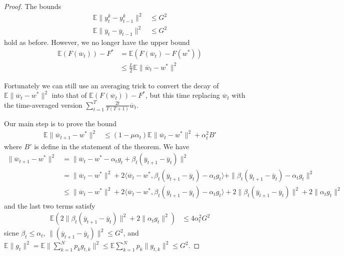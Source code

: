 \begin{proof}
	The bounds 
	\begin{align*}
	\mathbb{E}\|y_{t}^{k}-y_{t-1}^{k}\|^{2} & \leq G^{2}\\
	\mathbb{E}\|\overline{y}_{t}-\overline{y}_{t-1}\|^{2} & \leq G^{2}
	\end{align*}
	hold as before. However, we no longer have the upper bound
	\begin{align*}
	\mathbb{E}(F(\overline{w}_{t}))-F^{\ast} & =\mathbb{E}(F(\overline{w}_{t})-F(w^{\ast}))\\
	& \leq\frac{L}{2}\mathbb{E}\|\overline{w}_{t}-w^{\ast}\|^{2}
	\end{align*}
	
	Fortunately we can still use an averaging trick to convert the decay
	of $\mathbb{E}\|\overline{w}_{t}-w^{\ast}\|^{2}$ into that of $\mathbb{E}(F(\overline{w}_{t}))-F^{\ast}$,
	but this time replacing $\overline{w}_{t}$ with the time-averaged
	version $\sum_{t=1}^{T}\frac{2t}{T(T+1)}\overline{w}_{t}$.
	
	Our main step is to prove the bound 
	\begin{align*}
	\mathbb{E}\|\overline{w}_{t+1}-w^{\ast}\|^{2} & \leq(1-\mu\alpha_{t})\mathbb{E}\|\overline{w}_{t}-w^{\ast}\|^{2}+\alpha_{t}^{2}B'
	\end{align*}
	where $B'$ is define in the statement of the theorem. We have 
	\begin{align*}
	\|\overline{w}_{t+1}-w^{\ast}\|^{2} & =\|\overline{w}_{t}-w^{\ast}-\alpha_{t}g_{t}+\beta_{t}(\overline{y}_{t+1}-\overline{y}_{t})\|^{2}\\
	& =\|\overline{w}_{t}-w^{\ast}\|^{2}+2\langle\overline{w}_{t}-w^{\ast},\beta_{t}(\overline{y}_{t+1}-\overline{y}_{t})-\alpha_{t}g_{t}\rangle+\|\beta_{t}(\overline{y}_{t+1}-\overline{y}_{t})-\alpha_{t}g_{t}\|^{2}\\
	& \leq\|\overline{w}_{t}-w^{\ast}\|^{2}+2\langle\overline{w}_{t}-w^{\ast},\beta_{t}(\overline{y}_{t+1}-\overline{y}_{t})-\alpha_{t}g_{t}\rangle+2\|\beta_{t}(\overline{y}_{t+1}-\overline{y}_{t})\|^{2}+2\|\alpha_{t}g_{t}\|^{2}
	\end{align*}
	and the last two terms satisfy 
	\begin{align*}
	\mathbb{E}\left(2\|\beta_{t}(\overline{y}_{t+1}-\overline{y}_{t})\|^{2}+2\|\alpha_{t}g_{t}\|^{2}\right) & \leq4\alpha_{t}^{2}G^{2}
	\end{align*}
	sicne $\beta_{t}\leq\alpha_{t}$, $\|(\overline{y}_{t+1}-\overline{y}_{t})\|^{2}\leq G^{2}$,
	and $\mathbb{E}\|g_{t}\|^{2}=\mathbb{E}\|\sum_{k=1}^{N}p_{k}g_{t,k}\|^{2}\leq\mathbb{E}\sum_{k=1}^{N}p_{k}\|g_{t,k}\|^{2}\leq G^{2}$. 
	

\end{proof}
